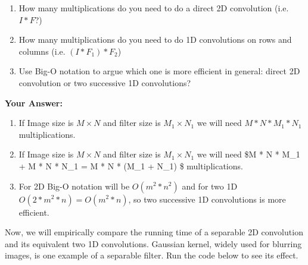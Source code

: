 \documentclass[11pt]{article}
\providecommand{\tightlist}{%
      \setlength{\itemsep}{0pt}\setlength{\parskip}{0pt}}
\begin{document}
\begin{enumerate}
\def\labelenumi{(\roman{enumi})}
\tightlist
\item
  How many multiplications do you need to do a direct 2D convolution
  (i.e. \(I*F\)?)
\item
  How many multiplications do you need to do 1D convolutions on rows and
  columns (i.e. \((I*F_1)*F_2\))
\item
  Use Big-O notation to argue which one is more efficient in general:
  direct 2D convolution or two successive 1D convolutions?
\end{enumerate}

    \textbf{Your Answer:}

\begin{enumerate}
\def\labelenumi{(\roman{enumi})}
\tightlist
\item
  If Image size is \(M\times N\) and filter size is \(M_1\times N_1\) we
  will need \(M * N * M_1 * N_1\) multiplications.
\item
  If Image size is \(M\times N\) and filter size is \(M_1\times N_1\) we
  will need \$M * N * M\_1 + M * N * N\_1 = M * N * (M\_1 + N\_1) \$
  multiplications.
\item
  For 2D Big-O notation will be \(O(m^2 * n^2)\) and for two 1D
  \(O(2 * m^2 * n) = O(m^2 * n)\), so two successive 1D convolutions is
  more efficient.
\end{enumerate}

    Now, we will empirically compare the running time of a separable 2D
convolution and its equivalent two 1D convolutions. Gaussian kernel,
widely used for blurring images, is one example of a separable filter.
Run the code below to see its effect.
\end{document}
